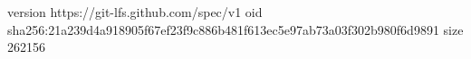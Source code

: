 version https://git-lfs.github.com/spec/v1
oid sha256:21a239d4a918905f67ef23f9c886b481f613ec5e97ab73a03f302b980f6d9891
size 262156
